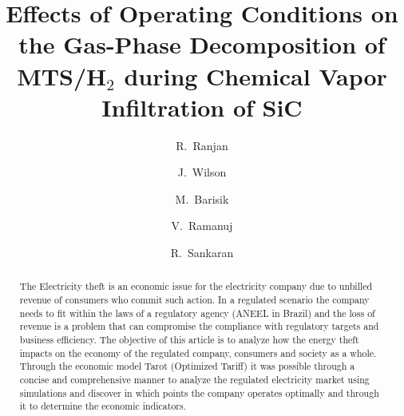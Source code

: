 \documentclass[10pt, letterpaper]{elsarticle}
\begin{document}
\begin{frontmatter}


\title{Effects of Operating Conditions on the Gas-Phase Decomposition of \\ MTS/H$_2$ during Chemical Vapor Infiltration of SiC}




\author[1]{R.~Ranjan}
\author[1]{J.~Wilson}
\author[1]{M.~Barisik}
\author[2]{V.~Ramanuj}
\author[2]{R.~Sankaran}

\address[1]{Department of Mechanical Engineering, The University of Tennessee Chattanooga \\
615 McCallie Avenue, Chattanooga, TN 37403, USA}
\address[2]{Computational Sciences and Engineering Division, Oak Ridge National Laboratory \\
1 Bethel Valley Rd., Oak Ridge, TN 37831, USA}




\begin{abstract}
The Electricity theft is an economic issue for the electricity company due to unbilled revenue of consumers who commit such action. In a regulated scenario the company needs to fit within the laws of a regulatory agency (ANEEL in Brazil) and the loss of revenue is a problem that can compromise the compliance with regulatory targets and business efficiency. The objective of this article is to analyze how the energy theft impacts on the economy of the regulated company, consumers and society as a whole. Through the economic model Tarot (Optimized Tariff) it was possible through a concise and comprehensive manner to analyze the regulated electricity market using simulations and discover in which points the company operates optimally and through it to determine the economic indicators.
\end{abstract}


\end{frontmatter}
\end{document}

